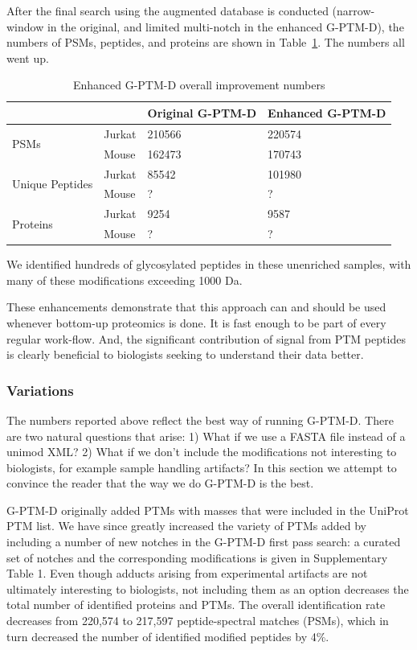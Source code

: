 \documentclass[journal=jprobs,manuscript=article]{achemso}
\begin{document}
After the final search using the augmented database is conducted (narrow-window in the original, and limited multi-notch in the enhanced G-PTM-D), the numbers of PSMs, peptides, and proteins are shown in Table~\ref{tab:table2}.
The numbers all went up.

\begin{table}[]
\centering
\caption{Enhanced G-PTM-D overall improvement numbers}
\label{tab:table2}
\begin{tabular}{ll|l|l}
                      &        & Original G-PTM-D & Enhanced G-PTM-D\\
\hline
\multirow{2}{*}{PSMs} & Jurkat  & 210566   &  220574  \\
                      & Mouse    & 162473   &   170743 \\
\hline
\multirow{2}{*}{Unique Peptides} & Jurkat  & 85542   &  101980  \\
                      & Mouse    & ?   &   ? \\
\hline
\multirow{2}{*}{Proteins} & Jurkat  & 9254   &  9587  \\
                      & Mouse    & ?   &   ? \\
\end{tabular}
\end{table}

We identified hundreds of glycosylated peptides in these unenriched samples, with many of these modifications exceeding 1000 Da.

These enhancements demonstrate that this approach can and should be used whenever bottom-up proteomics is done.
It is fast enough to be part of every regular work-flow.
And, the significant contribution of signal from PTM peptides is clearly beneficial to biologists seeking to understand their data better.

\subsubsection{Variations}

The numbers reported above reflect the best way of running G-PTM-D.
There are two natural questions that arise: 1) What if we use a FASTA file instead of a unimod XML? 2) What if we don't include the modifications not interesting to biologists, for example sample handling artifacts?
In this section we attempt to convince the reader that the way we do G-PTM-D is the best.

G-PTM-D originally added PTMs with masses that were included in the UniProt PTM list.
We have since greatly increased the variety of PTMs added by including a number of new notches in the G-PTM-D first pass search: a curated set of notches and the corresponding modifications is given in Supplementary Table 1.
Even though adducts arising from experimental artifacts are not ultimately interesting to biologists, not including them as an option decreases the total number of identified proteins and PTMs.
The overall identification rate decreases from 220,574 to 217,597 peptide-spectral matches (PSMs), which in turn decreased the number of identified modified peptides by 4\%.
\end{document}

